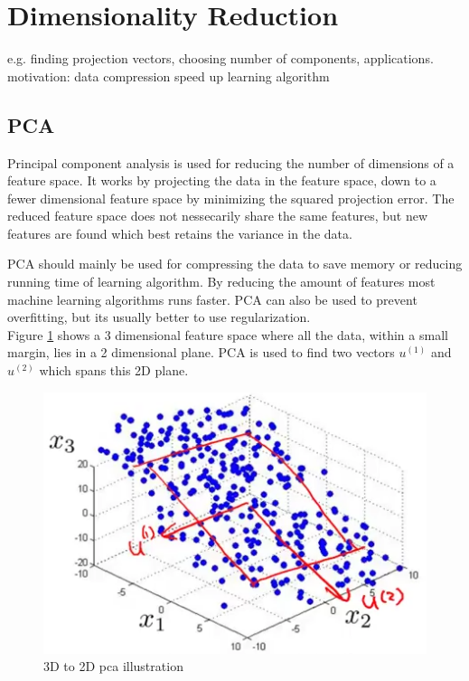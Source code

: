 
\section{Dimensionality Reduction}

e.g. finding projection vectors, choosing number of components, applications.\\

motivation:
data compression
speed up learning algorithm


\subsection{PCA}

Principal component analysis is used for reducing the number of dimensions of a feature space.
It works by projecting the data in the feature space, down to a fewer dimensional feature space by minimizing the squared projection error.
The reduced feature space does not nessecarily share the same features, but new features are found which best retains the variance in the data.

PCA should mainly be used for compressing the data to save memory or reducing running time of learning algorithm.
By reducing the amount of features most machine learning algorithms runs faster.
PCA can also be used to prevent overfitting, but its usually better to use regularization. \\

Figure \ref{fig:pca} shows a 3 dimensional feature space where all the data, within a small margin, lies in a 2 dimensional plane.
PCA is used to find two vectors $u^{(1)}$ and $u^{(2)}$ which spans this 2D plane.

\begin{figure}[H]
\centering
\includegraphics{billeder/pca}
\caption{3D to 2D pca illustration}
\label{fig:pca}
\end{figure}


